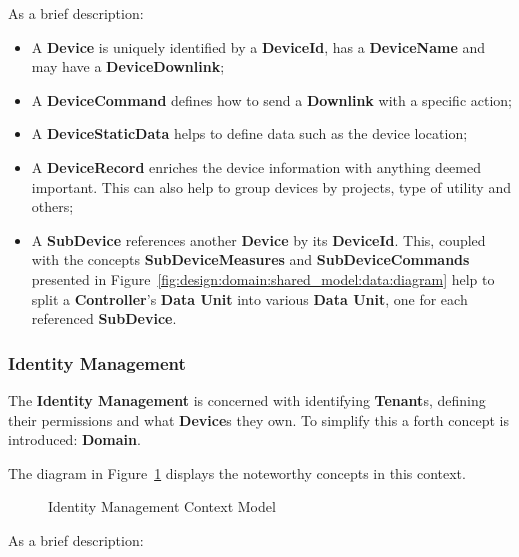 As a brief description:

\begin{itemize}
   \item A \textbf{Device} is uniquely identified by a \textbf{DeviceId}, has a \textbf{DeviceName} and may have a \textbf{DeviceDownlink};
   \item A \textbf{DeviceCommand} defines how to send a \textbf{Downlink} with a specific action;
   \item A \textbf{DeviceStaticData} helps to define data such as the device location;
   \item A \textbf{DeviceRecord} enriches the device information with anything deemed important. This can also help to group devices by projects, type of utility and others;
   \item A \textbf{SubDevice} references another \textbf{Device} by its \textbf{DeviceId}. This, coupled with the concepts \textbf{SubDeviceMeasures} and \textbf{SubDeviceCommands} presented in Figure~\ref{fig:design:domain:shared_model:data:diagram} help to split a \textbf{Controller}'s \textbf{Data Unit} into various \textbf{Data Unit}, one for each referenced \textbf{SubDevice}.
\end{itemize}

\subsubsection*{Identity Management}
\label{subsubsec:design:domain:bounded_contexts:identity}

The \textbf{Identity Management} is concerned with identifying \textbf{Tenant}s, defining their permissions and what \textbf{Device}s they own.
To simplify this a forth concept is introduced: \textbf{Domain}.

The diagram in Figure~\ref{fig:design:domain:bounded_contexts:identity:diagram} displays the noteworthy concepts in this context.

\begin{figure}[H]
   \centering
  \resizebox{\columnwidth}{!}
  {
     
  }
  \caption[Identity Management Context Model]{Identity Management Context Model}
  \label{fig:design:domain:bounded_contexts:identity:diagram}
\end{figure}

As a brief description:

